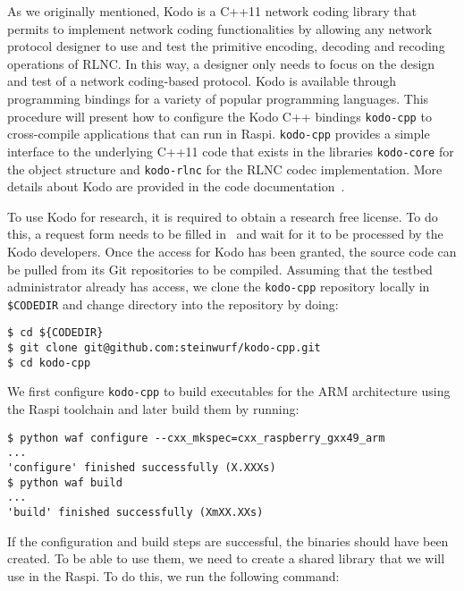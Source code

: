 As we originally mentioned, Kodo is a C++11 network coding library that
permits to implement network coding functionalities by allowing any network
protocol designer to use and test the primitive encoding, decoding and
recoding operations of \ac{RLNC}. In this way, a designer only needs to
focus on the design and test of a network coding-based protocol. Kodo is
available through programming bindings for a variety of popular
programming languages. This procedure will present how to configure the
Kodo C++ bindings \texttt{kodo-cpp} to cross-compile applications that can
run in \ac{Raspi}. \texttt{kodo-cpp} provides a simple interface to the
underlying C++11 code that exists in the libraries \texttt{kodo-core} for
the object structure and \texttt{kodo-rlnc} for the \ac{RLNC} codec
implementation. More details about Kodo are provided in the code
documentation~\cite{kodocppdoc}.

To use Kodo for research, it is required to obtain a research free license.
To do this, a request form needs to be filled
in~\cite{steinwurflicenselink} and wait for it to be processed by the Kodo
developers. Once
the access for Kodo has been granted, the source code can be pulled from
its Git repositories to be compiled. Assuming that the testbed
administrator already has access, we clone the \texttt{kodo-cpp}
repository locally in \texttt{\${CODEDIR}} and change directory into
the repository by doing:

\begin{lstlisting}[]
$ cd ${CODEDIR}
$ git clone git@github.com:steinwurf/kodo-cpp.git
$ cd kodo-cpp
\end{lstlisting}
\FloatBarrier
\vspace{-5mm}

We first configure \texttt{kodo-cpp} to build executables for the
\ac{ARM} architecture using the \ac{Raspi} toolchain and later build them
by running:
\begin{lstlisting}[]
$ python waf configure --cxx_mkspec=cxx_raspberry_gxx49_arm
...
'configure' finished successfully (X.XXXs)
$ python waf build
...
'build' finished successfully (XmXX.XXs)
\end{lstlisting}
\FloatBarrier
\vspace{-5mm}

If the configuration and build steps are successful, the binaries should
have been created. To be able to use them, we need to create a shared library
that we will use in the \ac{Raspi}. To do this, we run the following command:

